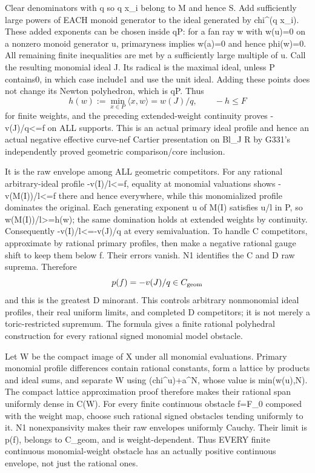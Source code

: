 \documentclass[11pt]{article}
\begin{document}
Clear denominators with q so q x\_i belong to M and hence S. Add sufficiently large powers of EACH monoid generator to the ideal generated by chi\textasciicircum{}(q x\_i). These added exponents can be chosen inside qP: for a fan ray w with w(u)=0 on a nonzero monoid generator u, primaryness implies w(a)=0 and hence phi(w)=0. All remaining finite inequalities are met by a sufficiently large multiple of u. Call the resulting monomial ideal J. Its radical is the maximal ideal, unless P contains0, in which case include1 and use the unit ideal. Adding these points does not change its Newton polyhedron, which is qP. Thus
\[
h(w):=\min_{x\in P}\langle x,w\rangle=w(J)/q,
\qquad -h\le F
\]
for finite weights, and the preceding extended-weight continuity proves -v(J)/q<=f on ALL supports. This is an actual primary ideal profile and hence an actual negative effective curve-nef Cartier presentation on Bl\_J R by G331's independently proved geometric comparison/core inclusion.

It is the raw envelope among ALL geometric competitors. For any rational arbitrary-ideal profile -v(I)/l<=f, equality at monomial valuations shows -v(M(I))/l<=f there and hence everywhere, while this monomialized profile dominates the original. Each generating exponent u of M(I) satisfies u/l in P, so w(M(I))/l>=h(w); the same domination holds at extended weights by continuity. Consequently -v(I)/l<=-v(J)/q at every semivaluation. To handle C competitors, approximate by rational primary profiles, then make a negative rational gauge shift to keep them below f. Their errors vanish. N1 identifies the C and D raw suprema. Therefore
\[
p(f)=-v(J)/q\in C_{\rm geom}
\]
and this is the greatest D minorant. This controls arbitrary nonmonomial ideal profiles, their real uniform limits, and completed D competitors; it is not merely a toric-restricted supremum. The formula gives a finite rational polyhedral construction for every rational signed monomial model obstacle.

Let W be the compact image of X under all monomial evaluations. Primary monomial profile differences contain rational constants, form a lattice by products and ideal sums, and separate W using (chi\textasciicircum{}u)+a\textasciicircum{}N, whose value is min(w(u),N). The compact lattice approximation proof therefore makes their rational span uniformly dense in C(W). For every finite continuous obstacle f=F\_0 composed with the weight map, choose such rational signed obstacles tending uniformly to it. N1 nonexpansivity makes their raw envelopes uniformly Cauchy. Their limit is p(f), belongs to C\_geom, and is weight-dependent. Thus EVERY finite continuous monomial-weight obstacle has an actually positive continuous envelope, not just the rational ones.
\end{document}
